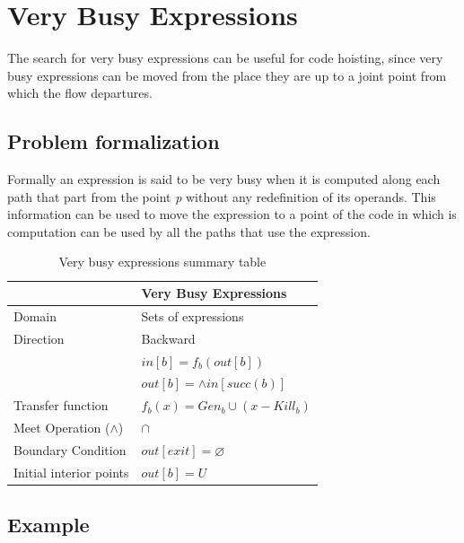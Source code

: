 \documentclass{article}
\begin{document}
\section{Very Busy Expressions}

The search for very busy expressions can be useful for code hoisting, since very busy expressions can be moved from the place they are up to a joint point from which the flow departures.

\subsection{Problem formalization}

Formally an expression is said to be very busy when it is computed along each path that part from the point \textit{p} without any redefinition of its operands. This information can be used to move the expression to a point of the code in which is computation can be used by all the paths that use the expression.

\begin{table}[H]
\centering
\begin{tabular}{|p{}|p{}|}
\hline
 & \textbf{Very Busy Expressions} \\
\hline
Domain & Sets of expressions \\
\hline
Direction & Backward \\
 & $in[b] = f_b(out[b])$ \\
 & $out[b] = \wedge in[succ(b)]$ \\
\hline
Transfer function & $f_b(x) = Gen_b \cup (x - Kill_b)$ \\
\hline
Meet Operation ($\wedge$) & $\cap$ \\
\hline
Boundary Condition & $out[exit] = \varnothing$ \\
\hline
Initial interior points & $out[b] = U$ \\
\hline
\end{tabular}
\caption{Very busy expressions summary table}
\label{tab:dataflow_problem_x}
\end{table}

\subsection{Example}
\end{document}
